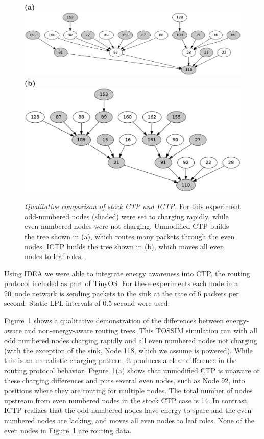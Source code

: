 \begin{figure}[t]
\begin{center}
\textbf{(a)}\\
\includegraphics[width=0.7\hsize]{./5-idea/figs/ctp.pdf}\\
\textbf{(b)}\\
\includegraphics[width=0.7\hsize]{./5-idea/figs/ictp.pdf}\\
\end{center}

\caption{\textit{Qualitative comparison of stock CTP and ICTP.} For this
experiment odd-numbered nodes (shaded) were set to charging rapidly, while
even-numbered nodes were not charging. Unmodified CTP builds the tree shown
in (a), which routes many packets through the even nodes. ICTP builds the
tree shown in (b), which moves all even nodes to leaf roles.}

\label{idea-fig-ictpqualitative}
\end{figure}

Using IDEA we were able to integrate energy awareness into CTP, the routing
protocol included as part of TinyOS. For these experiments each node in a
20~node network is sending packets to the sink at the rate of 6 packets per
second. Static LPL intervals of 0.5 second were used. 

Figure~\ref{idea-fig-ictpqualitative} shows a qualitative demonstration of
the differences between energy-aware and non-energy-aware routing trees. This
TOSSIM simulation ran with all odd numbered nodes charging rapidly and all
even numbered nodes not charging (with the exception of the sink, Node 118,
which we assume is powered). While this is an unrealistic charging pattern,
it produces a clear difference in the routing protocol behavior.
Figure~\ref{idea-fig-ictpqualitative}(a) shows that unmodified CTP is unaware
of these charging differences and puts several even nodes, such as Node 92,
into positions where they are routing for multiple nodes. The total number of
nodes upstream from even numbered nodes in the stock CTP case is 14. In
contrast, ICTP realizes that the odd-numbered nodes have energy to spare and
the even-numbered nodes are lacking, and moves all even nodes to leaf roles.
None of the even nodes in Figure~\ref{idea-fig-ictpqualitative} are routing
data.

